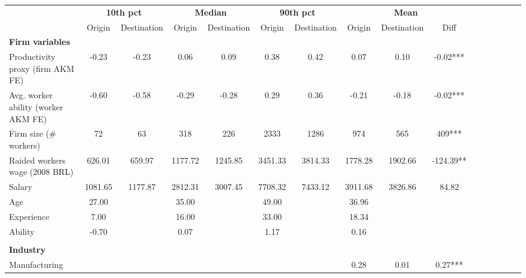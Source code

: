 {
\def\sym#1{\ifmmode^{#1}\else\(^{#1}\)\fi}
\begin{tabular}{l*{5}{ccc}}
\toprule
                    &\multicolumn{2}{c}{\textbf{10th pct}}&\multicolumn{2}{c}{\textbf{Median}}&\multicolumn{2}{c}{\textbf{90th pct}}&\multicolumn{3}{c}{\textbf{Mean}}        \\\cmidrule(lr){2-3}\cmidrule(lr){4-5}\cmidrule(lr){6-7}\cmidrule(lr){8-10}
                    &      Origin& Destination&      Origin& Destination&      Origin& Destination&      Origin& Destination&        Diff   \\
\midrule
\textbf{Firm variables}&            &            &            &            &            &            &            &            &               \\
Productivity proxy (firm AKM FE)&       -0.23&       -0.23&        0.06&        0.09&        0.38&        0.42&        0.07&        0.10&       -0.02***\\
Avg. worker ability (worker AKM FE)&       -0.60&       -0.58&       -0.29&       -0.28&        0.29&        0.36&       -0.21&       -0.18&       -0.02***\\
Firm size (\# workers)&          72&          63&         318&         226&        2333&        1286&         974&         565&         409***\\
Raided workers wage (2008 BRL)&      626.01&      659.97&     1177.72&     1245.85&     3451.33&     3814.33&     1778.28&     1902.66&     -124.39** \\
Salary              &     1081.65&     1177.87&     2812.31&     3007.45&     7708.32&     7433.12&     3911.68&     3826.86&       84.82   \\
Age                 &       27.00&            &       35.00&            &       49.00&            &       36.96&            &               \\
Experience          &        7.00&            &       16.00&            &       33.00&            &       18.34&            &               \\
Ability             &       -0.70&            &        0.07&            &        1.17&            &        0.16&            &               \\
\\ \textbf{Industry}&            &            &            &            &            &            &            &            &               \\
Manufacturing       &            &            &            &            &            &            &        0.28&        0.01&        0.27***\\

\end{tabular}}

